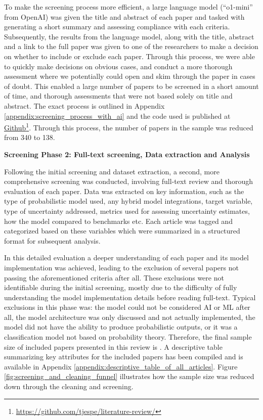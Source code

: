 To make the screening process more efficient, a large language model (``o1-mini'' from OpenAI) was given the title and abstract of each paper and tasked with generating a short summary and assessing compliance with each criteria. Subsequently, the results from the language model, along with the title, abstract and a link to the full paper was given to one of the researchers to make a decision on whether to include or exclude each paper. Through this process, we were able to quickly make decisions on obvious cases, and conduct a more thorough assessment where we potentially could open and skim through the paper in cases of doubt. This enabled a large number of papers to be screened in a short amount of time, and thorough assessments that were not based solely on title and abstract. The exact process is outlined in Appendix \ref{appendix:screening_process_with_ai} and the code used is published at \href{https://github.com/tjespe/literature-review/}{Github}\footnote{\label{footnote:github_link}\href{https://github.com/tjespe/literature-review/}{https://github.com/tjespe/literature-review/}}. Through this process, the number of papers in the sample was reduced from 340 to 138. 



\textbf{Screening Phase 2: Full-text screening, Data extraction and Analysis}\nopagebreak

Following the initial screening and dataset extraction, a second, more comprehensive screening was conducted, involving full-text review and thorough evaluation of each paper. Data was extracted on key information, such as the type of probabilistic model used, any hybrid model integrations, target variable, type of uncertainty addressed, metrics used for assessing uncertainty estimates, how the model compared to benchmarks etc. Each article was tagged and categorized based on these variables which were summarized in a structured format for subsequent analysis. 

In this detailed evaluation a deeper understanding of each paper and its model implementation was achieved, leading to the exclusion of several papers not passing the aforementioned criteria after all. These exclusions were not identifiable during the initial screening, mostly due to the difficulty of fully understanding the model implementation details before reading full-text. Typical exclusions in this phase was: the model could not be considered AI or ML after all, the model architecture was only discussed and not actually implemented, the model did not have the ability to produce probabilistic outputs, or it was a classification model not based on probability theory. Therefore, the final sample size of included papers presented in this review is \samplesize. A descriptive table summarizing key attributes for the included papers has been compiled and is available in Appendix \ref{appendix:descriptive_table_of_all_articles}. Figure \ref{fig:screening_and_cleaning_funnel} illustrates how the sample size was reduced down through the cleaning and screening.

